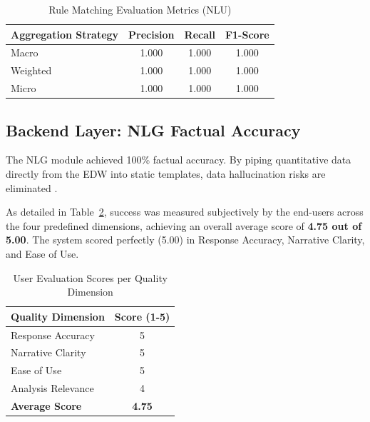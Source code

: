 \documentclass[conference]{IEEEtran}
\begin{document}
\begin{table}[htbp] \footnotesize
\caption{Rule Matching Evaluation Metrics (NLU)}
\begin{center}
\begin{tabular}{lccc}
\toprule
\textbf{Aggregation Strategy} & \textbf{Precision} & \textbf{Recall} & \textbf{F1-Score} \\
\midrule
Macro & 1.000 & 1.000 & 1.000 \\
Weighted & 1.000 & 1.000 & 1.000 \\
Micro & 1.000 & 1.000 & 1.000 \\
\bottomrule
\end{tabular}
\label{tab:nlu}
\end{center}

\end{table}
\vspace{-0.3cm}

\subsection{Backend Layer: NLG Factual Accuracy}
The NLG module achieved 100\% factual accuracy. By piping quantitative data directly from the EDW into static templates, data hallucination risks are eliminated \cite{Celikyilmaz2020EvalTextGen}. 

As detailed in Table~\ref{tab:user_eval}, success was measured subjectively by the end-users across the four predefined dimensions, achieving an overall average score of \textbf{4.75 out of 5.00}. The system scored perfectly (5.00) in Response Accuracy, Narrative Clarity, and Ease of Use.

\begin{table}[htbp] \footnotesize
\caption{User Evaluation Scores per Quality Dimension}
\begin{center}
\begin{tabular}{lc}
\toprule
\textbf{Quality Dimension} & \textbf{Score (1-5)} \\
\midrule
Response Accuracy & 5 \\
Narrative Clarity & 5 \\
Ease of Use & 5 \\
Analysis Relevance & 4 \\
\midrule
\textbf{Average Score} & \textbf{4.75} \\
\bottomrule
\end{tabular}
\label{tab:user_eval}
\end{center}

\end{table}
\vspace{-0.3cm}
\end{document}
